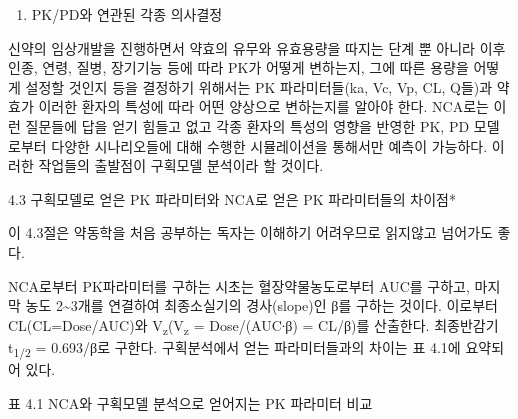 \documentclass[
  11pt,
  krantz2, a4paper, twoside]{krantz}
\providecommand{\tightlist}{%
  \setlength{\itemsep}{0pt}\setlength{\parskip}{0pt}}
\begin{document}
\begin{enumerate}
\def\labelenumi{\arabic{enumi}.}
\setcounter{enumi}{2}
\tightlist
\item
  PK/PD와 연관된 각종 의사결정
\end{enumerate}

신약의 임상개발을 진행하면서 약효의 유무와 유효용량을 따지는 단계 뿐
아니라 이후 인종, 연령, 질병, 장기기능 등에 따라 PK가 어떻게 변하는지,
그에 따른 용량을 어떻게 설정할 것인지 등을 결정하기 위해서는 PK
파라미터들(ka, Vc, Vp, CL, Q들)과 약효가 이러한 환자의 특성에 따라 어떤
양상으로 변하는지를 알아야 한다. NCA로는 이런 질문들에 답을 얻기 힘들고
없고 각종 환자의 특성의 영향을 반영한 PK, PD 모델로부터 다양한
시나리오들에 대해 수행한 시뮬레이션을 통해서만 예측이 가능하다. 이러한
작업들의 출발점이 구획모델 분석이라 할 것이다.

4.3 구획모델로 얻은 PK 파라미터와 NCA로 얻은 PK 파라미터들의 차이점*

이 4.3절은 약동학을 처음 공부하는 독자는 이해하기 어려우므로 읽지않고
넘어가도 좋다.

NCA로부터 PK파라미터를 구하는 시초는 혈장약물농도로부터 AUC를 구하고,
마지막 농도 2\textasciitilde3개를 연결하여 최종소실기의 경사(slope)인 β를 구하는
것이다. 이로부터 CL(CL=Dose/AUC)와 V\textsubscript{z}(V\textsubscript{z} = Dose/(AUC∙β) = CL/β)를
산출한다. 최종반감기 t\textsubscript{1/2} = 0.693/β로 구한다. 구획분석에서 얻는
파라미터들과의 차이는 표 4.1에 요약되어 있다.

표 4.1 NCA와 구획모델 분석으로 얻어지는 PK 파라미터 비교
\end{document}
